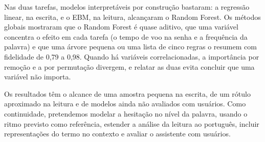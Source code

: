 \documentclass[12pt,a4paper]{article}
\begin{document}
Nas duas tarefas, modelos interpretáveis por construção bastaram: a regressão
linear, na escrita, e o EBM, na leitura, alcançaram o Random Forest. Os métodos
globais mostraram que o Random Forest é quase aditivo, que uma variável
concentra o efeito em cada tarefa (o tempo de voo na senha e a frequência da
palavra) e que uma árvore pequena ou uma lista de cinco regras o resumem com
fidelidade de 0,79 a 0,98. Quando há variáveis correlacionadas, a importância
por remoção e a por permutação divergem, e relatar as duas evita concluir que
uma variável não importa.

Os resultados têm o alcance de uma amostra pequena na escrita, de um rótulo
aproximado na leitura e de modelos ainda não avaliados com usuários. Como
continuidade,
pretendemos modelar a hesitação no nível da palavra, usando o ritmo previsto
como referência, estender a análise da leitura ao português, incluir
representações do termo no contexto e avaliar o assistente com usuários.
\end{document}
